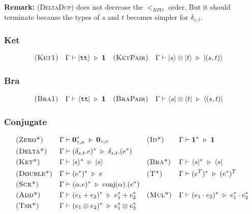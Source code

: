 
\textbf{Remark:} \textsc{(DeltaDcp)} does not decrease the $<_{RPO}$ order. But it should terminate because the types of $s$ and $t$ becomes simpler for $\delta_{s, t}$.

\subsubsection*{Ket}
\begin{align*}
  & \textsc{(Ket1)} && \Gamma \vdash |\texttt{tt}\rangle \ \triangleright\  \mathbf{1}
  && \textsc{(KetPair)} && \Gamma \vdash |s\rangle \otimes |t\rangle\ \triangleright\ |(s, t)\rangle 
\end{align*}

\subsubsection*{Bra}
\begin{align*}
  & \textsc{(Bra1)} && \Gamma \vdash \langle \texttt{tt}| \ \triangleright\  \mathbf{1}
  && \textsc{(BraPair)} && \Gamma \vdash \langle s| \otimes \langle t|\ \triangleright\ \langle (s, t)| 
\end{align*}


\subsubsection*{Conjugate}
\begin{align*}
  & \textsc{(Zero*)} && \Gamma \vdash \textbf{0}_{\tau, \sigma}^* \ \triangleright\  \textbf{0}_{\tau, \sigma}
  && \textsc{(Id*)} && \Gamma \vdash \mathbf{1}^* \ \triangleright\  \mathbf{1} \\
  & \textsc{(Delta*)} &&
  \Gamma \vdash (\delta_{s,t}.e)^* \ \triangleright\  \delta_{s,t}.(e^*)\\
  & \textsc{(Ket*)} && \Gamma \vdash |s\rangle^* \ \triangleright\  |s\rangle
  && \textsc{(Bra*)} && \Gamma \vdash \langle s|^* \ \triangleright\  \langle s| \\
  & \textsc{(Double*)} && \Gamma \vdash (e^*)^*\ \triangleright\  e
  && \textsc{(T*)} && \Gamma \vdash (e^T)^* \ \triangleright\ (e^*)^T \\
  & \textsc{(Scr*)} && \Gamma \vdash (\alpha.e)^* \ \triangleright\  \mathrm{conj}(\alpha).(e^*) \\
  & \textsc{(Add*)} && \Gamma \vdash (e_1 + e_2)^* \ \triangleright\  e_1^* + e_2^* 
  && \textsc{(Mul*)} && \Gamma \vdash (e_1 \cdot e_2)^* \ \triangleright\  e_1^* \cdot e_2^* \\
  & \textsc{(Tsr*)} && \Gamma \vdash (e_1 \otimes e_2)^* \ \triangleright\  e_1^* \otimes e_2^*
\end{align*}

